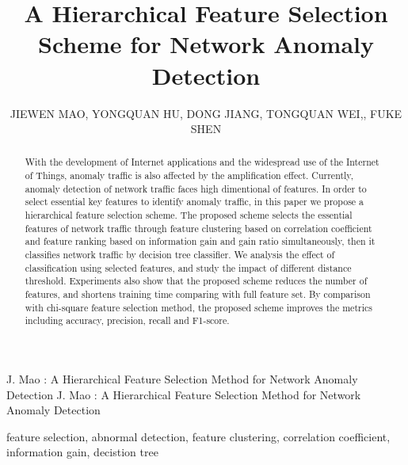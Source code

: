 \documentclass{ieeeaccess}
\theoremstyle{definition}
\begin{document}

\title{A Hierarchical Feature Selection Scheme for Network Anomaly Detection}
\author{
    \uppercase{Jiewen Mao},
    \uppercase{Yongquan Hu}, 
    \uppercase{Dong Jiang}, 
    \uppercase{Tongquan Wei},, \uppercase{Fuke Shen}}
\address{School of Computer Science and Technology, East China Normal University, Shanghai 200062, China}

\markboth
{J. Mao \headeretal: A Hierarchical Feature Selection Method for Network Anomaly Detection}
{J. Mao \headeretal: A Hierarchical Feature Selection Method for Network Anomaly Detection}


\begin{abstract}
    With the development of Internet applications and the widespread use of the Internet of Things, anomaly traffic is also affected by the amplification effect. 
    Currently, anomaly detection of network traffic faces high dimentional of features. In order to select essential key features to identify anomaly traffic, in this paper we propose a hierarchical feature selection scheme. 
    The proposed scheme selects the essential features of network traffic through feature clustering based on correlation coefficient and feature ranking based on information gain and gain ratio simultaneously, then it classifies network traffic by decision tree classifier. 
    We analysis the effect of classification using selected features, and study the impact of different distance threshold. Experiments also show that the proposed scheme reduces the number of features, and shortens training time comparing with full feature set. 
    By comparison with chi-square feature selection method, the proposed scheme improves the metrics including accuracy, precision, recall and F1-score.
\end{abstract}

\begin{keywords}
    feature selection, abnormal detection, feature clustering, correlation coefficient, information gain, decistion tree
\end{keywords}

\titlepgskip=-15pt

\maketitle
\end{document}

